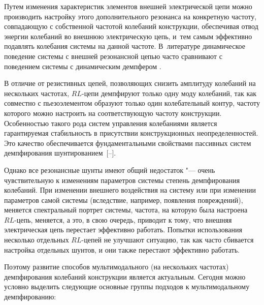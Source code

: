 Путем изменения характеристик элементов внешней электрической цепи можно производить настройку этого дополнительного резонанса на конкретную частоту, совпадающую с собственной частотой колебаний конструкции, обеспечивая отвод энергии колебаний во внешнюю электрическую цепь, и~тем самым эффективно подавлять колебания системы на данной частоте. В~литературе динамическое поведение системы с внешней резонансной цепью часто сравнивают с поведением системы с динамическим демпфером \cite{mult:Ref1}.



В отличие от резистивных цепей, позволяющих снизить амплитуду колебаний на нескольких частотах, $RL$-цепи демпфируют только одну моду колебаний, так как совместно с пьезоэлементом образуют только один колебательный контур, частоту которого можно настроить на соответствующую частоту конструкции. Особенностью такого рода систем управления колебаниями является гарантируемая стабильность в присутствии конструкционных неопределенностей. Это качество обеспечивается фундаментальными свойствами пассивных систем демпфирования шунтированием~[--].



Однако все резонансные шунты имеют общий недостаток "--- очень чувствительную к изменениям параметров системы степень демпфирования колебаний. При изменении внешнего воздействия на систему или при изменении параметров самой системы (вследствие, например, появления повреждений), меняется спектральный портрет системы, частота, на которую была настроена $RL$-цепь, меняется, а это, в свою очередь, приводит к тому, что внешняя электрическая цепь перестает эффективно работать. Попытки использования несколько отдельных $RL$-цепей не улучшают ситуацию, так как часто сбивается настройка отдельных шунтов, и они также перестают эффективно работать.



Поэтому развитие способов мультимодального (на нескольких частотах) демпфирования колебаний конструкции является актуальным. Сегодня можно условно выделить следующие основные группы подходов к мультимодальному демпфированию:

